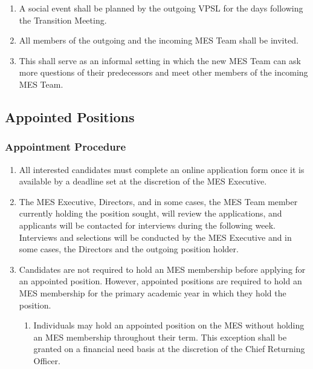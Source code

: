 \begin{enumerate}
  \begin{enumerate}
   \item
    A social event shall be planned by the outgoing VPSL for the days following the Transition Meeting.
   \item
    All members of the outgoing and the incoming MES Team shall be invited.
   \item
    This shall serve as an informal setting in which the new MES Team can ask more questions of their predecessors and meet other members of the incoming MES Team.
  \end{enumerate}
\end{enumerate}

\subsection{Appointed Positions}
\label{appointed-positions-selection}

\subsubsection{Appointment Procedure}
\label{appointment-procedure}
\begin{enumerate}
 \item
  All interested candidates must complete an online application form once it is available by a deadline set at the discretion of the MES Executive.
 \item
  The MES Executive, Directors, and in some cases, the MES Team member currently holding the position sought, will review the applications, and applicants will be contacted for interviews during the following week. Interviews and selections will be conducted by the MES Executive and in some cases, the Directors and the outgoing position holder.
 \item
  Candidates are not required to hold an MES membership before applying for an appointed position. However, appointed positions are required to hold an MES membership for the primary academic year in which they hold the position.

  \begin{enumerate}
   \item
    Individuals may hold an appointed position on the MES without holding an MES membership throughout their term. This exception shall be granted on a financial need basis at the discretion of the Chief Returning Officer.
  \end{enumerate}

\end{enumerate}

